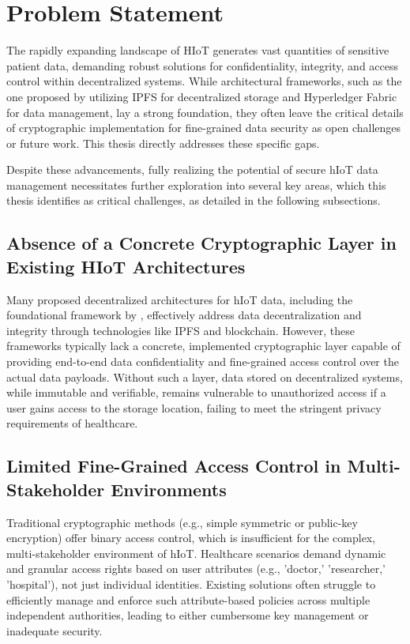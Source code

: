 \documentclass[cic,tc,english]{iiufrgs}
\numberwithin{algorithm}{chapter}
\begin{document}
    \section{Problem Statement}
        \label{sec:problemstatement}

        The rapidly expanding landscape of HIoT generates vast quantities of sensitive patient data, demanding robust solutions for confidentiality, integrity, and access control within decentralized systems. While architectural frameworks, such as the one proposed by \citet{laura2023} utilizing IPFS for decentralized storage and Hyperledger Fabric for data management, lay a strong foundation, they often leave the critical details of cryptographic implementation for fine-grained data security as open challenges or future work. This thesis directly addresses these specific gaps.

        Despite these advancements, fully realizing the potential of secure hIoT data management necessitates further exploration into several key areas, which this thesis identifies as critical challenges, as detailed in the following subsections.

        \subsection{Absence of a Concrete Cryptographic Layer in Existing HIoT Architectures}
            Many proposed decentralized architectures for hIoT data, including the foundational framework by \citet{laura2023}, effectively address data decentralization and integrity through technologies like IPFS and blockchain. However, these frameworks typically lack a concrete, implemented cryptographic layer capable of providing end-to-end data confidentiality and fine-grained access control over the actual data payloads. Without such a layer, data stored on decentralized systems, while immutable and verifiable, remains vulnerable to unauthorized access if a user gains access to the storage location, failing to meet the stringent privacy requirements of healthcare.

        \subsection{Limited Fine-Grained Access Control in Multi-Stakeholder Environments}
            Traditional cryptographic methods (e.g., simple symmetric or public-key encryption) offer binary access control, which is insufficient for the complex, multi-stakeholder environment of hIoT. Healthcare scenarios demand dynamic and granular access rights based on user attributes (e.g., 'doctor,' 'researcher,' 'hospital'), not just individual identities. Existing solutions often struggle to efficiently manage and enforce such attribute-based policies across multiple independent authorities, leading to either cumbersome key management or inadequate security.
\end{document}

